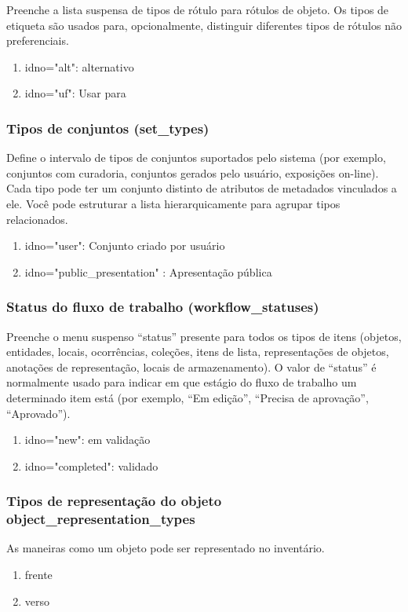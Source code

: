 Preenche a lista suspensa de tipos de rótulo para rótulos de objeto. Os tipos de etiqueta são usados para, opcionalmente, distinguir diferentes tipos de rótulos não preferenciais.

\begin{enumerate}
	\item idno="alt": alternativo
	\item idno="uf": Usar para
\end{enumerate}

\subsubsection{Tipos de conjuntos (set\_types)}
Define o intervalo de tipos de conjuntos suportados pelo sistema (por exemplo, conjuntos com curadoria, conjuntos gerados pelo usuário, exposições on-line). Cada tipo pode ter um conjunto distinto de atributos de metadados vinculados a ele. Você pode estruturar a lista hierarquicamente para agrupar tipos relacionados.

\begin{enumerate}
	\item idno="user": Conjunto criado por usuário
	\item idno="public\_presentation" : Apresentação pública
\end{enumerate}

\subsubsection{Status do fluxo de trabalho (workflow\_statuses)}
Preenche o menu suspenso ``status'' presente para todos os tipos de itens (objetos, entidades, locais, ocorrências, coleções, itens de lista, representações de objetos, anotações de representação, locais de armazenamento). O valor de ``status'' é normalmente usado para indicar em que estágio do fluxo de trabalho um determinado item está (por exemplo, ``Em edição'', ``Precisa de aprovação'', ``Aprovado'').

\begin{enumerate}
	\item idno="new": em validação
	\item idno="completed": validado
\end{enumerate}

\subsubsection{Tipos de representação do objeto object\_representation\_types}
As maneiras como um objeto pode ser representado no inventário.
\begin{enumerate}
	\item frente
	\item verso
\end{enumerate}


